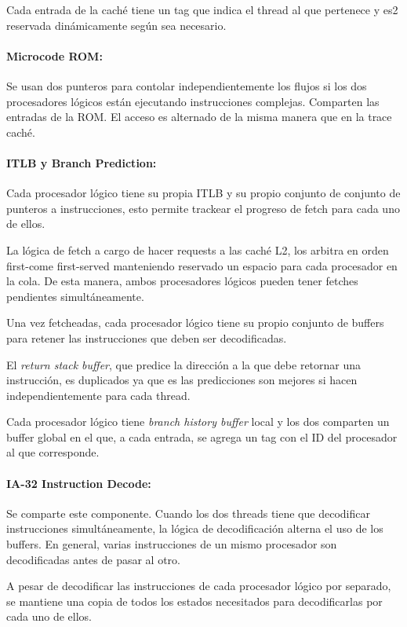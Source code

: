 Cada entrada de la caché tiene un tag que indica el thread al que pertenece y es2 reservada dinámicamente según sea necesario.

\paragraph{Microcode ROM:} Se usan dos punteros para contolar independientemente los flujos si los dos procesadores lógicos están ejecutando instrucciones complejas. Comparten las entradas de la ROM. El acceso es alternado de la misma manera que en la trace caché.

\paragraph{ITLB y Branch Prediction:} Cada procesador lógico tiene su propia ITLB y su propio conjunto de conjunto de punteros a instrucciones, esto permite trackear el progreso de fetch para cada uno de ellos.

La lógica de fetch a cargo de hacer requests a las caché L2, los arbitra en orden first-come first-served manteniendo reservado un espacio para cada procesador en la cola. De esta manera, ambos procesadores lógicos pueden tener fetches pendientes simultáneamente. 

Una vez fetcheadas, cada procesador lógico tiene su propio conjunto de buffers para retener las instrucciones que deben ser decodificadas.

El \textit{return stack buffer}, que predice la dirección a la que debe retornar una instrucción, es duplicados ya que es las predicciones son mejores si hacen independientemente para cada thread.

Cada procesador lógico tiene \textit{branch history buffer} local y los dos comparten un buffer global en el que, a cada entrada, se agrega un tag con el ID del procesador al que corresponde.

\paragraph{IA-32 Instruction Decode: } Se comparte este componente. Cuando los dos threads tiene que decodificar instrucciones simultáneamente, la lógica de decodificación alterna el uso de los buffers. En general, varias instrucciones de un mismo procesador son decodificadas antes de pasar al otro.

A pesar de decodificar las instrucciones de cada procesador lógico por separado, se mantiene una copia de todos los estados necesitados para decodificarlas por cada uno de ellos. 

